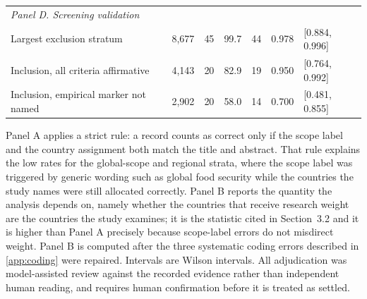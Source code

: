 \begin{table}[t]
\begin{tabular*}{\textwidth}{@{\extracolsep\fill}l r r r r r l@{}}
\midrule
\multicolumn{7}{l}{\textit{Panel D. Screening validation}} \\
Largest exclusion stratum & 8,677 & 45 & 99.7 & 44 & 0.978 & [0.884, 0.996] \\
Inclusion, all criteria affirmative & 4,143 & 20 & 82.9 & 19 & 0.950 & [0.764, 0.992] \\
Inclusion, empirical marker not named & 2,902 & 20 & 58.0 & 14 & 0.700 & [0.481, 0.855] \\
\bottomrule
\end{tabular*}
\begin{tablenotes}
\item[] Panel A applies a strict rule: a record counts as correct only if the scope label and the country assignment both match the title and abstract. That rule explains the low rates for the global-scope and regional strata, where the scope label was triggered by generic wording such as global food security while the countries the study names were still allocated correctly. Panel B reports the quantity the analysis depends on, namely whether the countries that receive research weight are the countries the study examines; it is the statistic cited in Section~3.2 and it is higher than Panel A precisely because scope-label errors do not misdirect weight. Panel B is computed after the three systematic coding errors described in \ref{app:coding} were repaired. Intervals are Wilson intervals. All adjudication was model-assisted review against the recorded evidence rather than independent human reading, and requires human confirmation before it is treated as settled.
\end{tablenotes}
\end{table}

